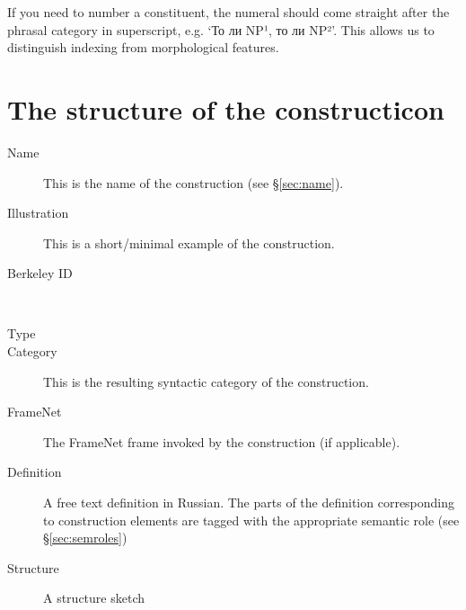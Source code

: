\documentclass[a4paper,11pt, onecolumn,twoside]{article}
\begin{document}
If you need to number a constituent, the numeral should come straight after the phrasal
category in superscript, e.g. `То ли NP¹, то ли NP²'. This allows us to distinguish indexing
from morphological features.

\section{The structure of the constructicon}

\begin{description}
  \item[Name] This is the name of the construction (see §\ref{sec:name}).
  \item[Illustration] This is a short/minimal example of the construction.
  \item[Berkeley ID] ~
  \item[Type]
  \item[Category] This is the resulting syntactic category of the construction.
  \item[FrameNet] The FrameNet frame invoked by the construction (if applicable).
  \item[Definition] A free text definition in Russian. The parts of the definition 
      corresponding to construction elements are tagged with the appropriate semantic role (see §\ref{sec:semroles})
  \item[Structure] A structure sketch
\end{description}



% 
\end{document}
